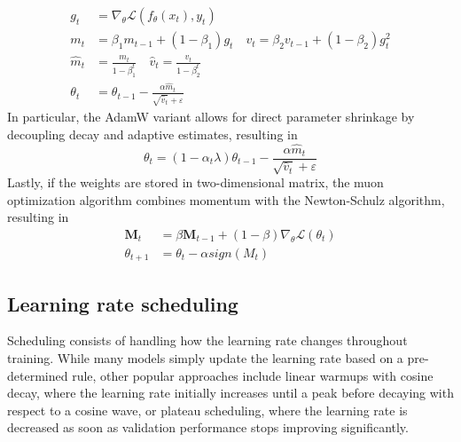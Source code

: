 \documentclass{report}
\begin{document}
\begin{align*}
    g_t &= \nabla_{\theta}\mathcal{L}(f_{\theta}(x_t), y_t) \\
    m_t &= \beta_1m_{t - 1} + (1 - \beta_1)g_t \quad v_t = \beta_2v_{t - 1} + (1 - \beta_2)g_t^2 \\
    \hat{m}_t &= \frac{m_t}{1 - \beta_1^t} \quad \hat{v}_t = \frac{v_t}{1 - \beta_2^t} \\
    \theta_t &= \theta_{t - 1} - \frac{\alpha\hat{m}_t}{\sqrt{\hat{v}_t} + \varepsilon}
\end{align*}
In particular, the AdamW variant allows for direct parameter shrinkage by decoupling decay and adaptive estimates, resulting in
\[\theta_t = (1 - \alpha_t\lambda)\theta_{t - 1} - \frac{\alpha\hat{m}_t}{\sqrt{\hat{v}_t} + \varepsilon}\]
Lastly, if the weights are stored in two-dimensional matrix, the muon optimization algorithm combines momentum with the Newton-Schulz algorithm, resulting in
\begin{align*}
\mathbf{M}_t &= \beta \mathbf{M}_{t - 1} + (1 - \beta)\nabla_{\theta}\mathcal{L}(\theta_t) \\
    \theta_{t + 1} &= \theta_t - \alpha sign(M_t)
\end{align*}
\subsection{Learning rate scheduling}
Scheduling consists of handling how the learning rate changes throughout training. \newline
While many models simply update the learning rate based on a pre-determined rule, other popular approaches include linear warmups with cosine decay, where the learning rate initially increases until a peak before decaying with respect to a cosine wave, or plateau scheduling, where the learning rate is decreased as soon as validation performance stops improving significantly.
\end{document}
